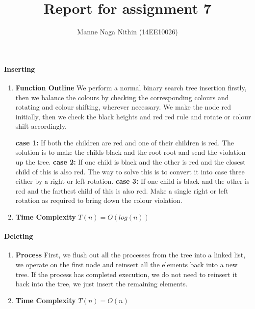 \documentclass[a4paper,11pt]{article}
\title{Report for assignment 7}
\author{Manne Naga Nithin (14EE10026)}
\begin{document}
\maketitle

\paragraph{Inserting}
\begin{enumerate}
 \item \textbf{Function Outline}\newline
 We perform a normal binary search tree insertion firstly, then we balance the colours by checking the corresponding colours and rotating and colour shifting, wherever necessary.\newline
 We make the node red initially, then we check the black heights and red red rule and rotate or colour shift accordingly.

\textbf{case 1:} If both the children are red and one of their children is red.\newline
The solution is to make the childs black and the root root and send the violation up the tree.\newline
\textbf{case 2:} If one child is black and the other is red and the closest child of this is also red.\newline
The way to solve this is to convert it into case three either by a right or left rotation.\newline
\textbf{case 3:} If one child is black and the other is red and the farthest child of this is also red.\newline
Make a single right or left rotation as required to bring down the colour violation.\newline
 \item \textbf{Time Complexity}\newline
 $T(n)=O(log(n))$\newline
\end{enumerate}

\paragraph{Deleting}
\begin{enumerate}
	\item \textbf{Process}\newline
	First, we flush out all the processes from the tree into a linked list, we operate on the first node and reinsert all the elements back into a new tree.\newline
	If the process has completed execution, we do not need to reinsert it back into the tree, we just insert the remaining elements.\newline
	
	\item \textbf{Time Complexity}\newline
	$T(n)=O(n)$\newline
	
\end{enumerate}
\end{document}
